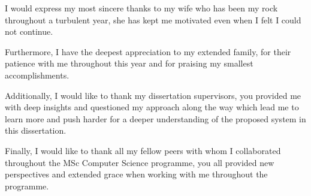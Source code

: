 I would express my most sincere thanks to my wife who has been my rock throughout a turbulent year, she has kept me motivated even when I felt I could not continue. \par Furthermore, I have the deepest appreciation to my extended family, for their patience with me throughout this year and for praising my smallest accomplishments.\par Additionally, I would like to thank my dissertation supervisors, you provided me with deep insights and questioned my approach along the way which lead me to learn more and push harder for a deeper understanding of the proposed system in this dissertation. \par Finally, I would like to thank all my fellow peers with whom I collaborated throughout the MSc Computer Science programme, you all provided new perspectives and extended grace when working with me throughout the programme. 